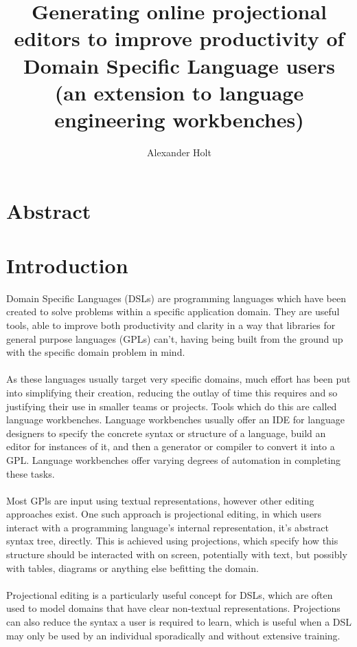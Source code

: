 \documentclass{article}
\begin{document}
\newcommand{\RSetup}[0]{R1\xspace}
\newcommand{\RCustom}[0]{R2\xspace}
\newcommand{\RLightweight}[0]{R3\xspace}
\newcommand{\RIntuitive}[0]{R4\xspace}
\newcommand{\RFamiliarity}{R5\xspace}

\title{Generating online projectional editors to improve productivity of
Domain Specific Language users (an extension to language engineering
workbenches)}
\author{Alexander Holt}
\maketitle

%
\section*{Abstract}
\clearpage
\tableofcontents
\clearpage

\section{Introduction}

Domain Specific Languages (DSLs) are programming languages which have been created to solve problems within a specific application domain. They are useful tools, able to improve both productivity and clarity in a way that libraries for general purpose languages (GPLs) can't, having being built from the ground up with the specific domain problem in mind. 
\\
\\
As these languages usually target very specific domains, much effort has been put into simplifying their creation, reducing the outlay of time this requires and so justifying their use in smaller teams or projects. Tools which do this are called language workbenches. Language workbenches usually offer an IDE for language designers to specify the concrete syntax or structure of a language, build an editor for instances of it, and then a generator or compiler to convert it into a GPL. Language workbenches offer varying degrees of automation in completing these tasks.
\\
\\
Most GPls are input using textual representations, however other editing approaches exist. One such approach is projectional editing, in which users interact with a programming language's internal representation, it's abstract syntax tree, directly. This is achieved using projections, which specify how this structure should be interacted with on screen, potentially with text, but possibly with tables, diagrams or anything else befitting the domain. 
\\
\\
Projectional editing is a particularly useful concept for DSLs, which are often used to model domains that have clear non-textual representations. Projections can also reduce the syntax a user is required to learn, which is useful when a DSL may only be used by an individual sporadically and without extensive training.
\end{document}
